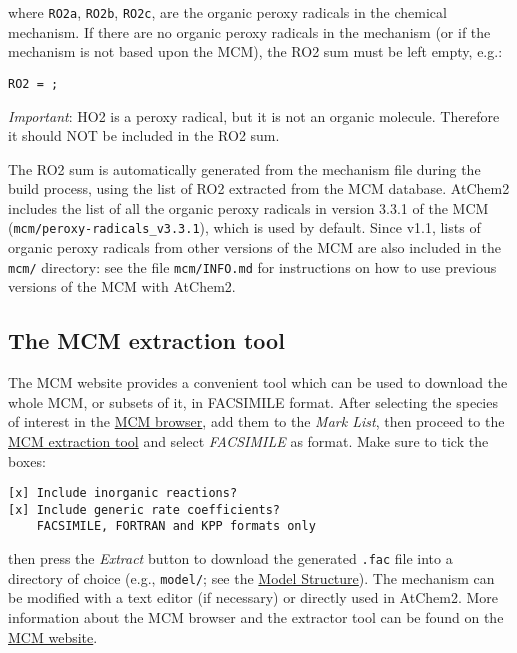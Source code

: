 where \texttt{RO2a}, \texttt{RO2b}, \texttt{RO2c}, are the organic
peroxy radicals in the chemical mechanism. If there are no organic
peroxy radicals in the mechanism (or if the mechanism is not based
upon the MCM), the RO2 sum must be left empty, e.g.:

\begin{verbatim}
RO2 = ;
\end{verbatim}

\emph{Important}: HO2 is a peroxy radical, but it is not an organic
molecule. Therefore it should NOT be included in the RO2 sum.

The RO2 sum is automatically generated from the mechanism file during
the build process, using the list of RO2 extracted from the MCM
database. AtChem2 includes the list of all the organic peroxy radicals
in version 3.3.1 of the MCM (\texttt{mcm/peroxy-radicals\_v3.3.1}),
which is used by default. Since v1.1, lists of organic peroxy radicals
from other versions of the MCM are also included in the \texttt{mcm/}
directory: see the file \texttt{mcm/INFO.md} for instructions on how
to use previous versions of the MCM with AtChem2.

\subsection{The MCM extraction tool} \label{subsec:the-mcm-extraction-tool}

The MCM website provides a convenient tool which can be used to
download the whole MCM, or subsets of it, in FACSIMILE format. After
selecting the species of interest in the
\href{http://mcm.leeds.ac.uk/MCMv3.3.1/roots.htt}{MCM browser}, add
them to the \emph{Mark List}, then proceed to the
\href{http://mcm.leeds.ac.uk/MCMv3.3.1/extract.htt}{MCM extraction
  tool} and select \emph{FACSIMILE} as format. Make sure to tick the
boxes:

\begin{verbatim}
[x] Include inorganic reactions?
[x] Include generic rate coefficients?
    FACSIMILE, FORTRAN and KPP formats only
\end{verbatim}

then press the \emph{Extract} button to download the generated
\texttt{.fac} file into a directory of choice (e.g., \texttt{model/};
see the \hyperref[sec:structure]{Model Structure}).  The mechanism can
be modified with a text editor (if necessary) or directly used in
AtChem2. More information about the MCM browser and the extractor tool
can be found on the \href{http://mcm.leeds.ac.uk}{MCM website}.

